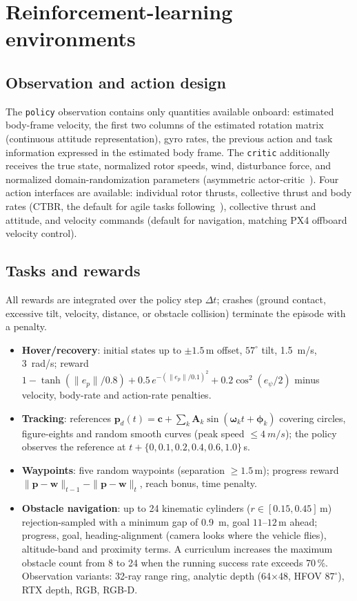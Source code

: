 \documentclass[11pt,a4paper]{article}
\newcommand{\vect}[1]{\bm{#1}}
\begin{document}
\section{Reinforcement-learning environments}
\subsection{Observation and action design}
The \texttt{policy} observation contains only quantities available onboard: estimated body-frame velocity, the first
two columns of the estimated rotation matrix (continuous attitude representation), gyro rates, the previous action
and task information expressed in the estimated body frame. The \texttt{critic} additionally receives the true state,
normalized rotor speeds, wind, disturbance force, and normalized domain-randomization parameters
(asymmetric actor-critic~\cite{pinto2018asymmetric}). Four action interfaces are available: individual rotor thrusts,
collective thrust and body rates (CTBR, the default for agile tasks following~\cite{kaufmann2022benchmark}),
collective thrust and attitude, and velocity commands (default for navigation, matching PX4 offboard velocity control).

\subsection{Tasks and rewards}
All rewards are integrated over the policy step $\Delta t$; crashes (ground contact, excessive tilt, velocity, distance,
or obstacle collision) terminate the episode with a penalty.
\begin{itemize}
\item \textbf{Hover/recovery}: initial states up to $\pm1.5$\,m offset, $57^\circ$ tilt, \SI{1.5}{m/s},
\SI{3}{rad/s}; reward $1-\tanh(\|e_p\|/0.8)+0.5\,e^{-(\|e_p\|/0.1)^2}+0.2\cos^2(e_\psi/2)$ minus velocity,
body-rate and action-rate penalties.
\item \textbf{Tracking}: references $\vect p_d(t)=\vect c+\sum_k\vect A_k\sin(\bm\omega_kt+\bm\phi_k)$ covering circles,
figure-eights and random smooth curves (peak speed $\le\SI{4}{m/s}$); the policy observes the reference at
$t+\{0,0.1,0.2,0.4,0.6,1.0\}$\,s.
\item \textbf{Waypoints}: five random waypoints (separation $\ge1.5$\,m); progress reward
$\|\vect p-\vect w\|_{t-1}-\|\vect p-\vect w\|_t$, reach bonus, time penalty.
\item \textbf{Obstacle navigation}: up to 24 kinematic cylinders ($r\in[0.15,0.45]$\,m) rejection-sampled with a
minimum gap of \SI{0.9}{m}, goal $11$--$12$\,m ahead; progress, goal, heading-alignment (camera looks where the vehicle
flies), altitude-band and proximity terms. A curriculum increases the maximum obstacle count from 8 to 24 when the
running success rate exceeds 70\,\%. Observation variants: 32-ray range ring, analytic depth (64$\times$48,
HFOV $87^\circ$), RTX depth, RGB, RGB-D.
\end{itemize}
\end{document}
